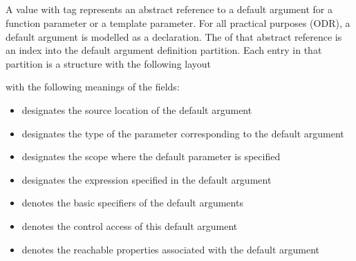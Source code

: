\subsection{} 
\label{sec:ifc:DeclSort:DefaultArgument}

A  value with tag  represents an abstract reference
to a default argument for a function parameter or a template parameter.  For all practical purposes (ODR),
a default argument is modelled as a declaration.  
The  of that abstract reference is an index into the default argument
definition partition.  Each entry in that partition is a structure with the following layout
%
\begin{figure}[H]
	\centering
\end{figure}
%
with the following meanings of the fields:
\begin{itemize}
	\item {} designates the source location of the default argument
	\item {} designates the type of the parameter corresponding to the default argument
	\item {} designates the scope where the default parameter is specified
	\item {} designates the expression specified in the default argument
	\item {} denotes the basic specifiers of the default arguments
	\item {} denotes the control access of this default argument
	\item {} denotes the reachable properties associated with the default argument
\end{itemize}


